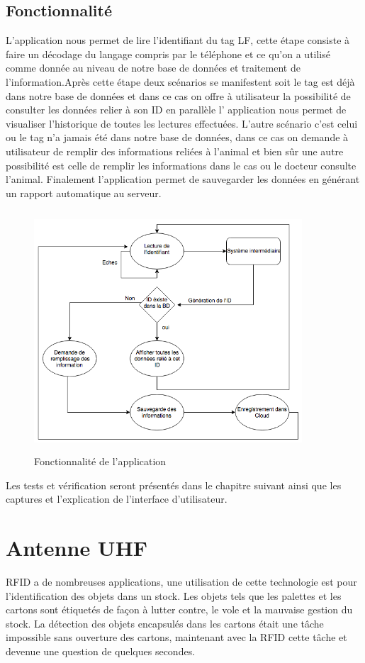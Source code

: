 \documentclass[11pt, a4paper, twoside]{book}
\begin{document}
\subsection{Fonctionnalité}
L'application nous permet de lire l'identifiant du tag LF, cette étape consiste à faire un décodage du langage compris par le téléphone et ce qu'on a utilisé comme donnée au niveau de notre base de données et traitement de l'information.Après cette étape deux scénarios se manifestent soit le tag est déjà dans notre base de données et dans ce cas on offre à utilisateur la possibilité de consulter les données relier à son ID en parallèle l' application nous permet de visualiser l'historique de toutes les lectures effectuées. L'autre scénario c'est celui ou le tag n'a jamais été dans notre base de données, dans ce cas on demande à utilisateur de remplir des informations reliées à l'animal et bien sûr une autre possibilité est celle de remplir les informations dans le cas ou le docteur consulte l'animal. Finalement l'application permet de sauvegarder les données en générant un rapport automatique au serveur.

\begin{figure}[H]
\centering
\includegraphics[width=10cm,height=9cm]{fonc}
\caption{Fonctionnalité de l'application}
\end{figure}
Les tests et vérification seront présentés dans le chapitre suivant ainsi que les captures et l'explication de l'interface d'utilisateur.

\section{Antenne UHF}
RFID a de nombreuses applications, une utilisation de cette technologie est pour l'identification des objets dans un stock. Les objets tels que les palettes et les cartons sont étiquetés de façon à lutter contre, le vole et la mauvaise gestion du stock. La détection des objets encapsulés dans les cartons était une tâche impossible sans ouverture des cartons, maintenant avec la RFID cette tâche et devenue une question de quelques secondes.
\end{document}
